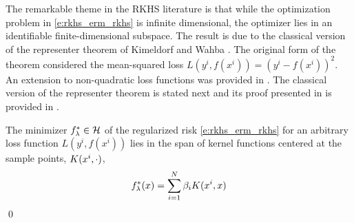 The remarkable theme in the RKHS literature is that while the optimization problem in \eqref{e:rkhs_erm_rkhs} is infinite dimensional,  the optimizer lies in an identifiable finite-dimensional subspace.
The result is due to the classical version of the representer theorem of Kimeldorf and Wahba \cite{kimwah71}. The original form of the theorem considered the mean-squared loss $L(y^i, f(x^i)) = (y^i - f(x^i))^2$. An extension to non-quadratic loss functions was provided in \cite{coxsull90}. The classical version of the representer theorem is stated next and its proof presented in \cite{schhersmo01} is provided in . 
\begin{theorem}
\label{theorem:rep_theorem}
The minimizer $f_\lambda^* \in {\cal H}$ of the regularized risk \eqref{e:rkhs_erm_rkhs} for an arbitrary loss function $L(y^i, f(x^i))$ lies in the span of kernel functions centered at the sample points, $K(x^i, \cdot)$,
\[
f_\lambda^*(x) = \sum_{i=1}^N \beta_i K(x^i, x)
\]
\qed
\end{theorem}
